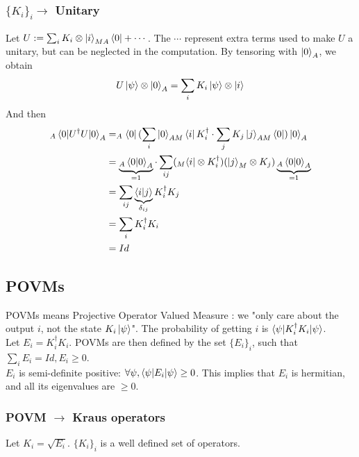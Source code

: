 \documentclass{article}
\begin{document}
\subsubsection*{$\{K_i\}_i \rightarrow$ Unitary}
Let $U := \sum_i K_i \otimes \ket{i}_{MA}\bra{0} + \cdots $.
The $\cdots$ represent extra terms used to make $U$ a unitary, but can be neglected in the computation.
By tensoring with $\ket{0}_A$, we obtain
\begin{equation}
    U\ket{\psi}\otimes \ket{0}_A = \sum_i K_i \ket{\psi}\otimes\ket{i}
\end{equation}
And then
\begin{equation}
    \begin{aligned}
        _A\braket{0 |U^\dagger U|0}_A
            & = _A\bra{0}(\sum_i\ket{0}_{AM}\bra{i} K_i^\dagger \cdot \sum_j K_j\ket{j}_{AM}\bra{0})\ket{0}_A \\
            & = \underbrace{_A\braket{0|0}_A}_{=1} \cdot \sum_{ij}(_M\bra{i}\otimes K_i^\dagger)(\ket{j}_M\otimes K_j) \underbrace{_A\braket{0|0}_A}_{=1} \\
            & = \sum_{ij}\underbrace{\braket{i|j}}_{\delta_{ij}} K_i^\dagger K_j \\
            & = \sum_i K_i^\dagger K_i \\
            & = Id
    \end{aligned}
\end{equation}
\subsection{POVMs}
POVMs means Projective Operator Valued Measure : we "only care about the output $i$, not the state $K_i\ket{\psi}$".
The probability of getting $i$ is $\braket{\psi | K_i^\dagger K_i | \psi}$.\\
Let $E_i = K_i^\dagger K_i$.
POVMs are then defined by the set $\{E_i\}_i$, such that $\sum_i E_i = Id, E_i\geq 0$.\\

$E_i$ is semi-definite positive: $ \forall \psi, \braket{\psi|E_i|\psi} \geq 0$. This implies that $E_i$ is hermitian, and all its eigenvalues are $\geq 0$.
\subsubsection*{POVM $\rightarrow$ Kraus operators}
Let $K_i = \sqrt{E_i}$. $\{K_i\}_i$ is a well defined set of operators.
\end{document}
